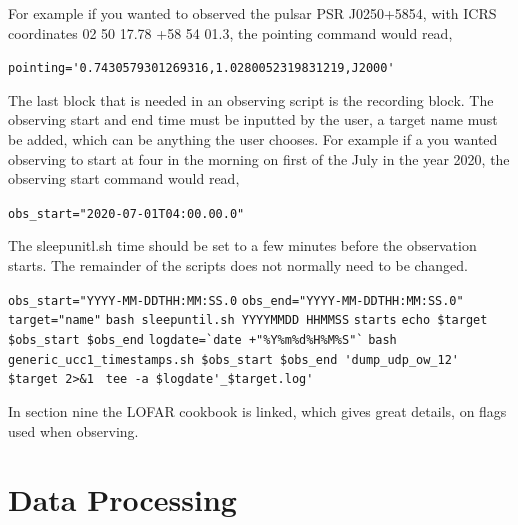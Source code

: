 \documentclass[11pt,fleqn]{book} %
\begin{document}
\vspace{7mm}

For example if you wanted to observed the pulsar PSR J0250+5854, with ICRS coordinates 02 50 17.78 +58 54 01.3, the pointing command would read,

\vspace{3mm}

\verb|pointing='0.7430579301269316,1.0280052319831219,J2000'|

\vspace{3mm}



The last block that is needed in an observing script is the recording block. The observing start and end time must be inputted by the user, a target name must be added, which can be anything the user chooses. For example if a you wanted observing to start at four in the morning on first of the July in the year 2020, the observing start command would read,

\vspace{3mm}

\verb|obs_start="2020-07-01T04:00.00.0"|

\vspace{3mm}

The sleepunitl.sh time should be set to a few minutes before the observation starts. The remainder of the scripts does not normally need to be changed.
%

\vspace{7mm}

\verb|obs_start="YYYY-MM-DDTHH:MM:SS.0|
\bigbreak{}
\verb|obs_end="YYYY-MM-DDTHH:MM:SS.0"|
\bigbreak{}
\verb|target="name"|
\bigbreak{}
\verb|bash sleepuntil.sh YYYYMMDD HHMMSS|
\bigbreak{}
\verb|starts|
\bigbreak{}
\verb|echo $target $obs_start $obs_end|
\bigbreak{}
\verb|logdate=`date +"%Y%m%d%H%M%S"`|
\bigbreak{}
\verb|bash generic_ucc1_timestamps.sh $obs_start $obs_end 'dump_udp_ow_12' $target 2>&1 |
\bigbreak{}
\verb|tee -a $logdate'_$target.log'|

\vspace{7mm}

In section nine the LOFAR cookbook is linked, which gives great details, on flags used when observing.

\section{Data Processing}
%
\end{document}
